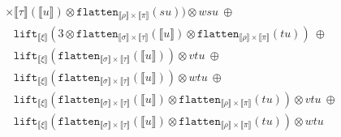 \documentclass[a4paper,UKenglish,cleveref,autoref,numberwithinsect]{lipics-v2019}
\theoremstyle{definition}
\newcommand{\flatten}{\mathtt{flatten}}
\newcommand{\lift}{\mathtt{lift}}
\newcommand{\typeinterpret}[1]{\llbracket #1 \rrbracket}
\newcommand{\interpret}[1]{\llbracket #1 \rrbracket}
\begin{document}
\begin{itemize}
\[\begin{array}{l}
{    \times \typeinterpret{\tau}}(\interpret{u}) \otimes
    \flatten_{\typeinterpret{\rho}
    \times \typeinterpret{\pi}}(su)) \otimes wsu\ \oplus \\
  \phantom{A}
    \lift_{\typeinterpret{\xi}}(3 \otimes \flatten_{
    \typeinterpret{\sigma} \times \typeinterpret{\tau}}(
    \interpret{u}) \otimes \flatten_{
    \typeinterpret{\rho} \times \typeinterpret{\pi}}(tu))\ \oplus \\
  \phantom{A}
    \lift_{\typeinterpret{\xi}}(\flatten_{\typeinterpret{\sigma}
    \times \typeinterpret{\tau}}(\interpret{u})) \otimes vtu\ \oplus \\
  \phantom{A}
    \lift_{\typeinterpret{\xi}}(\flatten_{\typeinterpret{\sigma}
    \times \typeinterpret{\tau}}(\interpret{u})) \otimes wtu\ \oplus \\
  \phantom{A}
    \lift_{\typeinterpret{\xi}}(\flatten_{\typeinterpret{\sigma}
    \times \typeinterpret{\tau}}(\interpret{u}) \otimes
    \flatten_{\typeinterpret{\rho} \times
    \typeinterpret{\pi}}(tu)) \otimes vtu\ \oplus \\
  \phantom{A}
    \lift_{\typeinterpret{\xi}}(\flatten_{\typeinterpret{\sigma}
    \times \typeinterpret{\tau}}(\interpret{u}) \otimes
    \flatten_{\typeinterpret{\rho}
    \times \typeinterpret{\pi}}(tu)) \otimes wtu
  \end{array}
  \]


\end{itemize}
\end{document}
